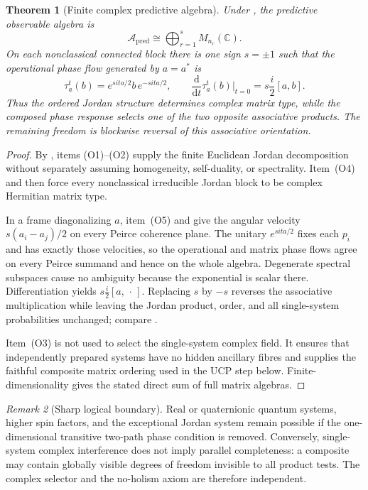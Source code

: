 \documentclass[11pt]{article}
\newtheorem{theorem}{Theorem}[section]
\theoremstyle{definition}
\theoremstyle{remark}
\newtheorem{remark}[theorem]{Remark}
\newcommand{\C}{\mathbb C}
\newcommand{\A}{\mathcal A}
\newcommand{\dd}{\mathrm d}
\newcommand{\pred}{\mathrm{pred}}
\begin{document}
\begin{theorem}[Finite complex predictive algebra]
\label{thm:complex-algebra}
Under , the predictive observable algebra is
\[
 \boxed{
 \A_{\pred}\cong\bigoplus_{r=1}^{s}M_{n_r}(\C).}
\]
On each nonclassical connected block there is one sign $s=\pm1$ such that the
operational phase flow generated by $a=a^*$ is
\[
 \tau_a^t(b)=e^{sita/2}b\,e^{-sita/2},
 \qquad
 \frac{\dd}{\dd t}\tau_a^t(b)\bigg|_{t=0}
 =s\frac{i}{2}[a,b].
\]
Thus the ordered Jordan structure determines complex matrix type, while the
composed phase response selects one of the two opposite associative products.
The remaining freedom is blockwise reversal of this associative orientation.
\end{theorem}

\begin{proof}
By
,
items \textup{(O1)}--\textup{(O2)} supply the finite Euclidean Jordan
decomposition without separately assuming homogeneity, self-duality, or
spectrality.  Item~\textup{(O4)} and
 then force every nonclassical irreducible
Jordan block to be complex Hermitian matrix type.

In a frame diagonalizing $a$, item~\textup{(O5)} and
 give the angular velocity
$s(a_i-a_j)/2$ on every Peirce coherence plane.  The unitary
$e^{sita/2}$ fixes each $p_i$ and has exactly those velocities, so the
operational and matrix phase flows agree on every Peirce summand and hence on
the whole algebra.  Degenerate spectral subspaces cause no ambiguity because
the exponential is scalar there.  Differentiation yields
$s\frac{i}{2}[a,\,\cdot\,]$.  Replacing $s$ by $-s$ reverses the
associative multiplication while leaving the Jordan product, order, and all
single-system probabilities unchanged; compare
\cite{AlfsenShultz1998,AlfsenShultz2003}.

Item~\textup{(O3)} is not used to select the single-system complex field.  It
ensures that independently prepared systems have no hidden ancillary fibres and
supplies the faithful composite matrix ordering used in the UCP step below.
Finite-dimensionality gives the stated direct sum of full matrix algebras.
\end{proof}

\begin{remark}[Sharp logical boundary]
Real or quaternionic quantum systems, higher spin factors, and the exceptional
Jordan system remain possible if the one-dimensional transitive two-path phase
condition is removed.  Conversely, single-system complex interference does not
imply parallel completeness: a composite may contain globally visible degrees
of freedom invisible to all product tests.  The complex selector and the
no-holism axiom are therefore independent.
\end{remark}
\end{document}
